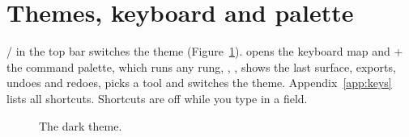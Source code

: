 \section{Themes, keyboard and palette}
/ in the top bar switches the theme (Figure~\ref{fig:dark}).  opens the keyboard map and
+ the command palette, which runs any rung, , , shows the last
surface, exports, undoes and redoes, picks a tool and switches the theme. Appendix~\ref{app:keys} lists all shortcuts.
Shortcuts are off while you type in a field.

\begin{figure}[h]
\caption{The dark theme.}
\label{fig:dark}
\end{figure}
